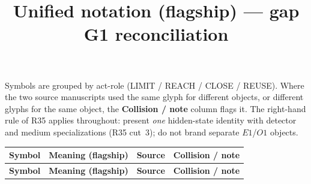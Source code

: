 \documentclass[10pt]{article}
\title{Unified notation (flagship) --- gap G1 reconciliation}
\author{}
\date{}
\begin{document}
\maketitle

\noindent
Symbols are grouped by act-role (LIMIT / REACH / CLOSE / REUSE). Where the two
source manuscripts used the same glyph for different objects, or different glyphs
for the same object, the \textbf{Collision / note} column flags it. The
right-hand rule of R35 applies throughout: present \emph{one} hidden-state
identity with detector and medium specializations (R35 cut~3); do not brand
separate \(E1\)/\(O1\) objects.

\renewcommand{\arraystretch}{1.25}
\begin{longtable}{@{}p{}p{}p{}p{}@{}}
\toprule
\textbf{Symbol} & \textbf{Meaning (flagship)} & \textbf{Source} &
\textbf{Collision / note} \\
\midrule
\endfirsthead
\toprule
\textbf{Symbol} & \textbf{Meaning (flagship)} & \textbf{Source} &
\textbf{Collision / note} \\
\midrule
\endhead


\end{longtable}
\end{document}
